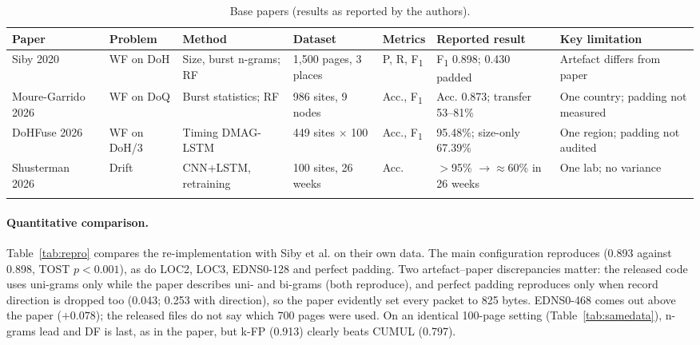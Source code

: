 \documentclass[pdflatex,sn-mathphys-num]{sn-jnl}
\newcommand{\Fone}{F\textsubscript{1}}
\begin{document}
\begin{table}[t]
\caption{Base papers (results as reported by the authors).}\label{tab:base}
\scriptsize\setlength{\tabcolsep}{3pt}
\begin{tabular*}{\textwidth}{@{\extracolsep\fill}L{0.12\textwidth}L{0.11\textwidth}L{0.14\textwidth}L{0.14\textwidth}L{0.08\textwidth}L{0.15\textwidth}L{0.15\textwidth}@{}}
\toprule
Paper & Problem & Method & Dataset & Metrics & Reported result & Key limitation \\
\midrule
Siby 2020~\cite{siby2020} & WF on DoH & Size, burst n-grams; RF & 1,500 pages, 3 places & P, R, \Fone{} & \Fone{} 0.898; 0.430 padded & Artefact differs from paper \\
Moure-Garrido 2026~\cite{mouregarrido2026} & WF on DoQ & Burst statistics; RF & 986 sites, 9 nodes & Acc., \Fone{} & Acc. 0.873; transfer 53--81\% & One country; padding not measured \\
DoHFuse 2026~\cite{zhang2026dohfuse} & WF on DoH/3 & Timing DMAG-LSTM & 449 sites $\times$ 100 & Acc., \Fone{} & 95.48\%; size-only 67.39\% & One region; padding not audited \\
Shusterman 2026~\cite{shusterman2026} & Drift & CNN+LSTM, retraining & 100 sites, 26 weeks & Acc. & $>$95\% $\to\approx$60\% in 26 weeks & One lab; no variance \\
\botrule
\end{tabular*}
\end{table}

\paragraph{Quantitative comparison.} Table~\ref{tab:repro} compares the re-implementation with Siby et al. on their own data. The main configuration reproduces (0.893 against 0.898, TOST $p<0.001$), as do LOC2, LOC3, EDNS0-128 and perfect padding. Two artefact--paper discrepancies matter: the released code uses uni-grams only while the paper describes uni- and bi-grams (both reproduce), and perfect padding reproduces only when record direction is dropped too (0.043; 0.253 with direction), so the paper evidently set every packet to 825 bytes. EDNS0-468 comes out above the paper ($+0.078$); the released files do not say which 700 pages were used. On an identical 100-page setting (Table~\ref{tab:samedata}), n-grams lead and DF is last, as in the paper, but k-FP (0.913) clearly beats CUMUL (0.797).
\end{document}
